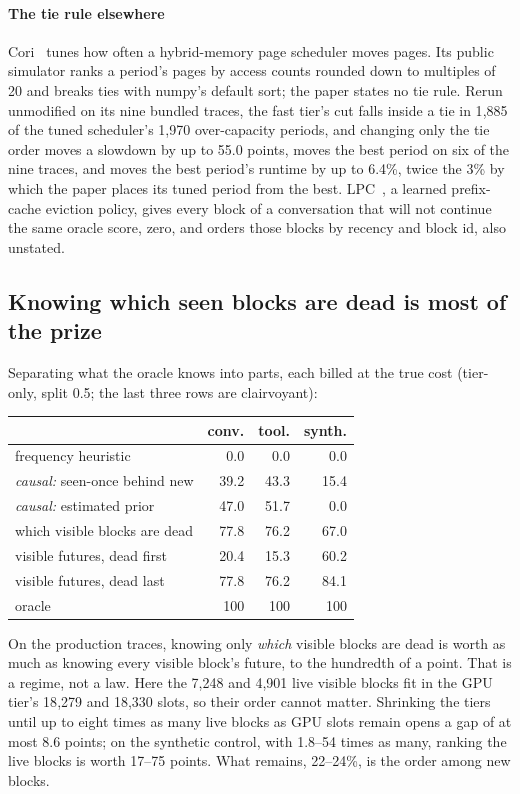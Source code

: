 \paragraph{The tie rule elsewhere} Cori~\cite{doudali2021cori} tunes how often a hybrid-memory page scheduler moves
pages. Its public simulator ranks a period's pages by access counts rounded down to multiples of 20 and breaks
ties with numpy's default sort; the paper states no tie rule. Rerun unmodified on its nine bundled traces, the
fast tier's cut falls inside a tie in 1{,}885 of the tuned scheduler's 1{,}970 over-capacity periods, and
changing only the tie order moves a slowdown by up to 55.0 points, moves the best period on six of the nine
traces, and moves the best period's runtime by up to 6.4\%, twice the 3\% by which the paper places its tuned
period from the best. LPC~\cite{yang2025lpc}, a learned prefix-cache eviction policy, gives every block of a
conversation that will not continue the same oracle score, zero, and orders those blocks by recency and block
id, also unstated.

\subsection{Knowing which seen blocks are dead is most of the prize}
\label{sec:ladder}
Separating what the oracle knows into parts, each billed at the true cost (tier-only, split 0.5; the
last three rows are clairvoyant):

\begin{center}\footnotesize\setlength{\tabcolsep}{3.5pt}
\begin{tabular}{@{}lrrr@{}}
\toprule
& conv. & tool. & synth. \\
\midrule
frequency heuristic & 0.0 & 0.0 & 0.0 \\
\emph{causal:} seen-once behind new & 39.2 & 43.3 & 15.4 \\
\emph{causal:} estimated prior & 47.0 & 51.7 & 0.0 \\
which visible blocks are dead & 77.8 & 76.2 & 67.0 \\
visible futures, dead first & 20.4 & 15.3 & 60.2 \\
visible futures, dead last & 77.8 & 76.2 & 84.1 \\
oracle & 100 & 100 & 100 \\
\bottomrule
\end{tabular}
\end{center}

\medskip
\noindent On the production traces, knowing only \emph{which} visible blocks are dead is worth as
much as knowing every visible block's future, to the hundredth of a point. That is a regime, not a law.
Here the 7{,}248 and 4{,}901 live visible blocks fit in the GPU tier's 18{,}279 and 18{,}330 slots, so their
order cannot matter. Shrinking the tiers until up to eight times as many live blocks as GPU slots remain
opens a gap of at most 8.6 points; on the synthetic control, with 1.8--54 times as many, ranking the live
blocks is worth 17--75 points. What remains, 22--24\%, is the order among new blocks.

